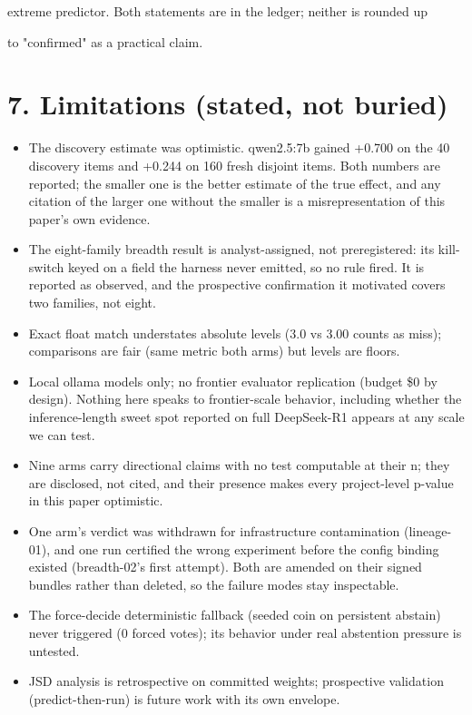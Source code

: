 \documentclass[11pt]{article}
\begin{document}
extreme predictor. Both statements are in the ledger; neither is rounded up

to "confirmed" as a practical claim.


\section*{7. Limitations (stated, not buried)}

\begin{itemize}
\item The discovery estimate was optimistic. qwen2.5:7b gained +0.700 on the 40 discovery items and +0.244 on 160 fresh disjoint items. Both numbers are reported; the smaller one is the better estimate of the true effect, and any citation of the larger one without the smaller is a misrepresentation of this paper's own evidence.
\item The eight-family breadth result is analyst-assigned, not preregistered: its kill-switch keyed on a field the harness never emitted, so no rule fired. It is reported as observed, and the prospective confirmation it motivated covers two families, not eight.
\item Exact float match understates absolute levels (3.0 vs 3.00 counts as miss); comparisons are fair (same metric both arms) but levels are floors.
\item Local ollama models only; no frontier evaluator replication (budget \$0 by design). Nothing here speaks to frontier-scale behavior, including whether the inference-length sweet spot reported on full DeepSeek-R1 appears at any scale we can test.
\item Nine arms carry directional claims with no test computable at their n; they are disclosed, not cited, and their presence makes every project-level p-value in this paper optimistic.
\item One arm's verdict was withdrawn for infrastructure contamination (lineage-01), and one run certified the wrong experiment before the config binding existed (breadth-02's first attempt). Both are amended on their signed bundles rather than deleted, so the failure modes stay inspectable.
\item The force-decide deterministic fallback (seeded coin on persistent abstain) never triggered (0 forced votes); its behavior under real abstention pressure is untested.
\item JSD analysis is retrospective on committed weights; prospective validation (predict-then-run) is future work with its own envelope.
\end{itemize}
\end{document}
